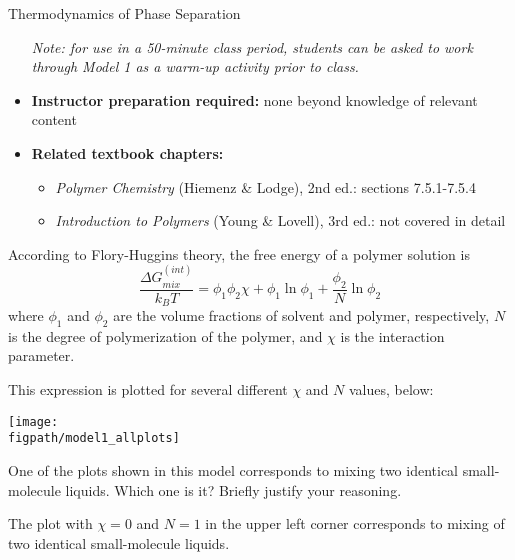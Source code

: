 \begin{activity}{Thermodynamics of Phase Separation}
\begin{instructornotes}
\begin{itemize}
			\emph{Note: for use in a 50-minute class period, students can be asked to work through Model 1 as a warm-up activity prior to class.}
			
		\item \textbf{Instructor preparation required:} none beyond knowledge of relevant content
		\item \textbf{Related textbook chapters:}
			\begin{itemize}
				\item \emph{Polymer Chemistry} (Hiemenz \& Lodge), 2nd ed.: sections 7.5.1-7.5.4
				\item \emph{Introduction to Polymers} (Young \& Lovell), 3rd ed.: not covered in detail
			\end{itemize}
	\end{itemize}

\end{instructornotes}


\begin{model}

According to Flory-Huggins theory, the free energy of a polymer solution is
\begin{equation*}
	\frac{\Delta G_{mix}^{(int)}}{k_B T} = \phi_1 \phi_2 \chi + \phi_1 \ln \phi_1 + \frac{\phi_2}{N}\ln \phi_2
\end{equation*}
where $\phi_1$ and $\phi_2$ are the volume fractions of solvent and polymer, respectively, $N$ is the degree of polymerization of the polymer, and $\chi$ is the interaction parameter.

This expression is plotted for several different $\chi$ and $N$ values, below:

\centerline{
	\texttt{[image: \\figpath/model1\_allplots]}}

\end{model}

\begin{ctqs}

	\question One of the plots shown in this model corresponds to mixing two identical small-molecule liquids.  Which one is it?  Briefly justify your reasoning.
	
		\begin{solution}[1.5in]{}
		
			The plot with $\chi=0$ and $N=1$ in the upper left corner corresponds to mixing of two identical small-molecule liquids.
						

\end{solution}
\end{ctqs}
\end{activity}
